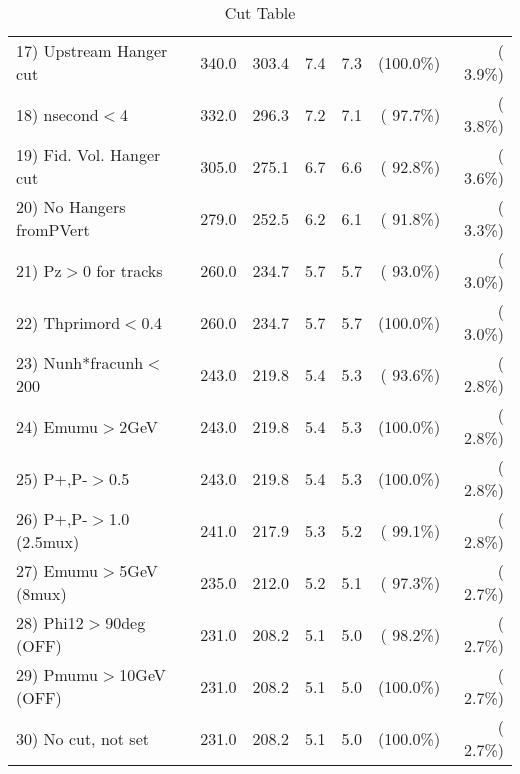 \begin{table}[h!]
\begin{tabular}{||l||r|r|r|r|r|r||}
 17) Upstream Hanger cut  &        340.0 &        303.4 &          7.4 &          7.3 & (100.0\%) & (  3.9\%) \\
 18) nsecond$<$4          &        332.0 &        296.3 &          7.2 &          7.1 & ( 97.7\%) & (  3.8\%) \\
 19) Fid. Vol. Hanger cut &        305.0 &        275.1 &          6.7 &          6.6 & ( 92.8\%) & (  3.6\%) \\
 20) No Hangers fromPVert &        279.0 &        252.5 &          6.2 &          6.1 & ( 91.8\%) & (  3.3\%) \\
 21) Pz$>$0 for tracks    &        260.0 &        234.7 &          5.7 &          5.7 & ( 93.0\%) & (  3.0\%) \\
 22) Thprimord$<$0.4      &        260.0 &        234.7 &          5.7 &          5.7 & (100.0\%) & (  3.0\%) \\
 23) Nunh*fracunh$<$200   &        243.0 &        219.8 &          5.4 &          5.3 & ( 93.6\%) & (  2.8\%) \\
 24) Emumu$>$2GeV         &        243.0 &        219.8 &          5.4 &          5.3 & (100.0\%) & (  2.8\%) \\
 25) P+,P-$>$0.5          &        243.0 &        219.8 &          5.4 &          5.3 & (100.0\%) & (  2.8\%) \\
 26) P+,P-$>$1.0 (2.5mux) &        241.0 &        217.9 &          5.3 &          5.2 & ( 99.1\%) & (  2.8\%) \\
 27) Emumu$>$5GeV  (8mux) &        235.0 &        212.0 &          5.2 &          5.1 & ( 97.3\%) & (  2.7\%) \\
 28) Phi12$>$90deg  (OFF) &        231.0 &        208.2 &          5.1 &          5.0 & ( 98.2\%) & (  2.7\%) \\
 29) Pmumu$>$10GeV  (OFF) &        231.0 &        208.2 &          5.1 &          5.0 & (100.0\%) & (  2.7\%) \\
 30) No cut, not set      &        231.0 &        208.2 &          5.1 &          5.0 & (100.0\%) & (  2.7\%) \\
 \hline
 \hline
 \end{tabular}
 \caption{Cut Table           }
 \label{tab-cutcohjpsi-mumu_cohpip}
 \end{table}
